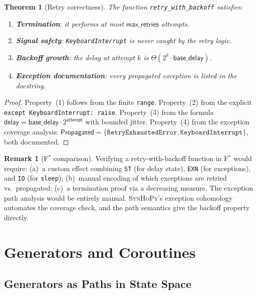 \documentclass[11pt,a4paper]{report}
\theoremstyle{definition}
\newtheorem{remark}[definition]{Remark}
\theoremstyle{plain}
\newtheorem{theorem}[definition]{Theorem}
\newcommand{\fstar}{F$^{*}$}
\newcommand{\synhopy}{\textsc{SynHoPy}}
\begin{document}
\begin{theorem}[Retry correctness]
The function \texttt{retry\_with\_backoff} satisfies:
\begin{enumerate}
  \item \textbf{Termination}: it performs at most $\mathsf{max\_retries}$
    attempts.
  \item \textbf{Signal safety}: \texttt{KeyboardInterrupt} is never caught
    by the retry logic.
  \item \textbf{Backoff growth}: the delay at attempt $k$ is
    $\Theta(2^k \cdot \mathsf{base\_delay})$.
  \item \textbf{Exception documentation}: every propagated exception is
    listed in the docstring.
\end{enumerate}
\end{theorem}
\begin{proof}
Property~(1) follows from the finite \texttt{range}.
Property~(2) from the explicit \texttt{except KeyboardInterrupt: raise}.
Property~(3) from the formula $\mathsf{delay} = \mathsf{base\_delay}
\cdot 2^{\mathsf{attempt}}$ with bounded jitter.
Property~(4) from the exception coverage analysis: $\mathsf{Propagated} =
\{\texttt{RetryExhaustedError}, \texttt{KeyboardInterrupt}\}$, both
documented.
\end{proof}

\begin{remark}[\fstar{} comparison]
Verifying a retry-with-backoff function in \fstar{} would require:
(a)~a custom effect combining \lstinline[style=fstar]|ST| (for delay state),
\lstinline[style=fstar]|EXN| (for exceptions), and \lstinline[style=fstar]|IO|
(for \texttt{sleep});
(b)~manual encoding of which exceptions are retried vs.\ propagated;
(c)~a termination proof via a decreasing measure.
The exception path analysis would be entirely manual.  \synhopy{}'s exception
cohomology automates the coverage check, and the path semantics give the
backoff property directly.
\end{remark}


\chapter{Generators and Coroutines}
\label{ch:generators}

\section{Generators as Paths in State Space}
\end{document}
